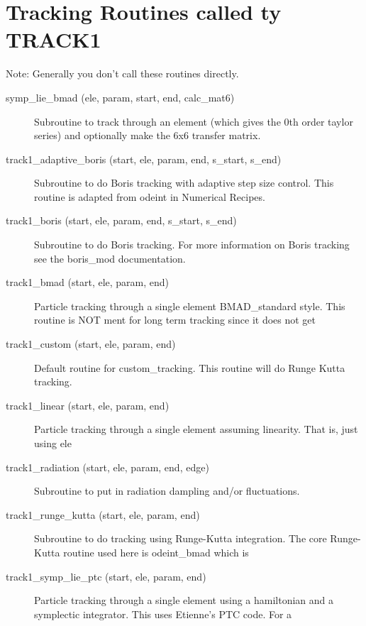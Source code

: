 \section{Tracking Routines called ty TRACK1}
\label{r:track1}   

Note: Generally you don't call these routines directly.

\begin{description}

\item[symp\_lie\_bmad (ele, param, start, end, calc\_mat6)] \Newline
Subroutine to track through an element (which gives the 0th order taylor series) and optionally make the 6x6 transfer matrix. 

\item[track1\_adaptive\_boris (start, ele, param, end, s\_start, s\_end)] \Newline
Subroutine to do Boris tracking with adaptive step size control. This routine is adapted from odeint in Numerical Recipes. 

\item[track1\_boris (start, ele, param, end, s\_start, s\_end)] \Newline
Subroutine to do Boris tracking. For more information on Boris tracking see the boris\_mod documentation. 

\item[track1\_bmad (start, ele, param, end)] \Newline
Particle tracking through a single element BMAD\_standard style. This routine is NOT ment for long term tracking since it does not get 

\item[track1\_custom (start, ele, param, end)] \Newline
Default routine for custom\_tracking. This routine will do Runge Kutta tracking. 

\item[track1\_linear (start, ele, param, end)] \Newline
Particle tracking through a single element assuming linearity. That is, just using ele%

\item[track1\_radiation (start, ele, param, end, edge)] \Newline
Subroutine to put in radiation dampling and/or fluctuations. 

\item[track1\_runge\_kutta (start, ele, param, end)] \Newline
Subroutine to do tracking using Runge-Kutta integration. The core Runge-Kutta routine used here is odeint\_bmad which is 

\item[track1\_symp\_lie\_ptc (start, ele, param, end)] \Newline
Particle tracking through a single element using a hamiltonian and a symplectic integrator. This uses Etienne's PTC code. For a 


\end{description}
